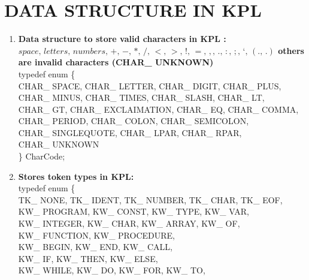 \documentclass[12pt, a4paper]{report}
\begin{document}
		\section{DATA STRUCTURE IN KPL}
			\begin{enumerate}
				\item \textbf{Data structure to store valid characters in KPL : $space,\, letters,\, numbers,\, +,\, -,\, *,\, /,\, <,\, >,\, ! ,\, =,\, , ,\, . ,\, : ,\, ; ,\, ‘ ,\, (. ,\, .)$ others are invalid characters (CHAR\_ UNKNOWN)}\\ \newline
					typedef enum \{\\
          CHAR\_ SPACE, CHAR\_ LETTER, CHAR\_ DIGIT, CHAR\_ PLUS,\\            
          CHAR\_ MINUS, CHAR\_ TIMES, CHAR\_ SLASH, CHAR\_ LT, \\
          CHAR\_ GT, CHAR\_ EXCLAIMATION, CHAR\_ EQ, CHAR\_ COMMA,\\
          CHAR\_ PERIOD, CHAR\_ COLON, CHAR\_ SEMICOLON, \\  
          CHAR\_ SINGLEQUOTE, CHAR\_ LPAR, CHAR\_ RPAR,  \\
          CHAR\_ UNKNOWN  \\
      \} CharCode;
				\item \textbf{Stores token types in KPL:}\\ \newline
				typedef enum \{\\
            TK\_ NONE, TK\_ IDENT, TK\_ NUMBER, TK\_ CHAR, TK\_ EOF,\\
            KW\_ PROGRAM, KW\_ CONST, KW\_ TYPE, KW\_ VAR,\\
            KW\_ INTEGER, KW\_ CHAR, KW\_ ARRAY, KW\_ OF, \\
            KW\_ FUNCTION, KW\_ PROCEDURE,\\
            KW\_ BEGIN, KW\_ END, KW\_ CALL,\\
            KW\_ IF, KW\_ THEN, KW\_ ELSE,\\
            KW\_ WHILE, KW\_ DO, KW\_ FOR, KW\_ TO,\\


\end{enumerate}
\end{document}

